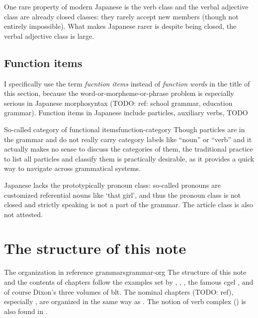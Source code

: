 \documentclass[UTF8, a4paper, oneside, scheme=plain]{ctexrep}
\newcommand*{\term}[1]{\emph{#1}}
\newcommand{\translate}[1]{`#1'}
\begin{document}
One rare property of modern Japanese is the verb class and the verbal adjective class 
are already closed classes:
they rarely accept new members (though not entirely impossible).
What makes Japanese rarer is despite being closed,
the verbal adjective class is large.

\subsection{Function items}

I specifically use the term \term{fucntion items} instead of \term{function words}
in the title of this section,
because the word-or-morpheme-or-phrase problem is especially serious in Japanese morphosyntax
(TODO: ref: school grammar, education grammar).
Function items in Japanese include particles, auxiliary verbs, TODO 

\begin{theorybox}{So-called category of functional items}{function-category}
    Though particles are in the grammar and do not really carry category labels like ``noun'' or ``verb''
    and it actually makes no sense to discuss the categories of them,
    the traditional practice to list all particles and classify them 
    is practically desirable, 
    as it provides a quick way to navigate across grammatical systems.
\end{theorybox}

Japanese lacks the prototypically pronoun class:
so-called pronouns are customized referential nouns like \translate{that girl},
and thus the pronoun class is not closed and strictly speaking is not a part of the grammar.
The article class is also not attested.

\section{The structure of this note}

\begin{theorybox}{The organization in reference grammars}{grammar-org}
    The structure of this note and the contents of chapters follow 
    the examples set by \citet{Friesen2017}, \citet{jacques2021grammar}, \citet{Grimm2021},
    the famous \acs{cgel} \citep{cgel}, and of course Dixon's three volumes of \acs{blt}.
    The nominal chapters (TODO: ref), 
    especially , 
    are organized in the same way as \citet{jacques2021grammar}.
    The notion of verb complex () is also found in 
    \citet{Friesen2017}.
\end{theorybox}
\end{document}
